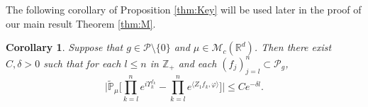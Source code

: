 \documentclass[12pt,a4paper]{amsart}
\theoremstyle{plain}
\newtheorem{cor}[thm]{Corollary}
\theoremstyle{definition}
\numberwithin{equation}{section}
\begin{document}
\begin{comment}
  Let $\delta_0 >0$ be the constant in Lemma \ref{lem: upper bound for usgx}.(7) and let $R$ be the corresponding $(\theta^{2+\beta}\vee \theta^{1+\beta+\delta_0})$-controller.
	According to \eqref{eq: estimate of J1}, we have for all $\theta\in \mathbb R$, $k\geq 0$, $t\geq k+1$ and $\epsilon> 0$,
  \begin{align}
    & J^{\theta f}_1(k,t,\epsilon)
      \leq \sum_{\rho \in \{\delta_0,1\}} \langle Q_0 RQ(\theta f), \mu \rangle e^{-(\alpha\frac{\rho}{1+\beta}-\epsilon\frac{1+\beta+\rho}{1+\beta})(t-k-1)} \\
    & \leq(|\theta|^{2+\beta}\vee |\theta|^{1+\beta+\delta_0}) \sum_{\rho \in \{\delta_0,1\}} \langle Q_0 RQf, \mu \rangle e^{ - ( \alpha \frac{ \rho} {1 + \beta} - \epsilon \frac{ 1 + \beta + \rho}{ 1 + \beta}) (t-k-1)}.
\end{align}
From the definitions of $Z_1$ and $m_{t,t+1}$ we get that for all $g\in \mathcal P, \theta \geq 0, t\geq 0$,
\[
	Z_1( \pm \theta g) 
  = \theta^{1+\beta} Z_1(\pm g), \quad m_{t,t+1}[\pm \theta g] = \theta^{1+\beta} m_t[\pm g].
\]
Therefore, we have for all $\theta >0, k \geq 0, t\geq k+1, \epsilon > 0$, $ J^{\pm \theta f}_2(t,k,\epsilon)
= \theta^{1+\beta} J_2^{\pm f}(t,k,\epsilon). $
According to this and \eqref{eq: right bound for J2},
we have that there exists $C > 0$ such that for all $\theta\in \mathbb R$, $k\geq 0$, $t\geq k+1$ and $\epsilon> 0$,
\begin{equation}
  \label{eq:31step3b}
  J^{\theta f}_2(t,k,\epsilon)
  \leq C |\theta|^{1+\beta}e^{-(\alpha \tilde \gamma - \epsilon)(t-k-1)}.
\end{equation}
Finally, noticing that $|\theta| < \Theta$, using the estimates of $J^{\theta f}_{i}, i = 1,2$ above and the estimate of $J_3$ in Step 4 of the proof of the previous lemma, we get the desired result by choosing $\epsilon$ small enough.
\end{proof}
\end{comment}
The following corollary of Proposition \ref{thm:Key} will be used later in the proof of our main result Theorem \ref{thm:M}.
\begin{cor}
  \label{cor:MI}
  Suppose that $g\in \mathcal{P}\setminus\{0\}$ and $\mu\in \mathcal M_c(\mathbb R^d)$.
  Then there exist $C,\delta>0$ such that for each $l\leq n$ in $\mathbb Z_+$ and each $(f_j)_{j=l}^n\subset \mathcal P_g$,
\begin{equation}
  \label{32corollary}
  \Big|\mathbb{\widetilde{P}}_{\mu}\Big[\prod_{k=l}^ne^{i \Upsilon^{f_k}_{k} }-\prod_{k=l}^n e^{\langle Z_1f_k, \varphi\rangle}\Big]\Big|\leq C e^{-\delta l}.
\end{equation}
\end{cor}
\end{document}
